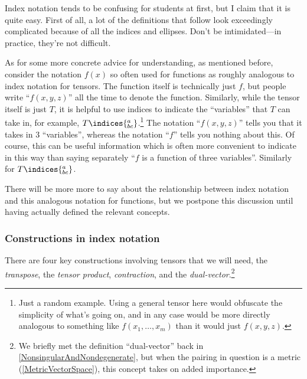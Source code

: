 Index notation tends to be confusing for students at first, but I claim that it is quite easy.  First of all, a lot of the definitions that follow look exceedingly complicated because of all the indices and ellipses.  Don't be intimidated---in practice, they're not difficult.

As for some more concrete advice for understanding, as mentioned before, consider the notation $f(x)$ so often used for functions as roughly analogous to index notation for tensors.  The function itself is technically just $f$, but people write ``$f(x,y,z)$'' all the time to denote the function.  Similarly, while the tensor itself is just $T$, it is helpful to use indices to indicate the ``variables'' that $T$ can take in, for example, $T\indices{^a_{bc}}$.\footnote{Just a random example.  Using a general tensor here would obfuscate the simplicity of what's going on, and in any case would be more directly analogous to something like $f(x_1,\ldots ,x_m)$ than it would just $f(x,y,z)$.}   The notation ``$f(x,y,z)$'' tells you that it takes in $3$ ``variables'', whereas the notation ``$f$'' tells you nothing about this.  Of course, this can be useful information which is often more convenient to indicate in this way than saying separately ``$f$ is a function of three variables''.  Similarly for $T\indices{^a_{bc}}$.

There will be more more to say about the relationship between index notation and this analogous notation for functions, but we postpone this discussion until having actually defined the relevant concepts.

\subsubsection{Constructions in index notation}

There are four key constructions involving tensors that we will need, the \emph{transpose}, the \emph{tensor product}, \emph{contraction}, and the \emph{dual-vector}.\footnote{We briefly met the definition ``dual-vector'' back in \cref{NonsingularAndNondegenerate}, but when the pairing in question is a metric (\cref{MetricVectorSpace}), this concept takes on added importance.}

